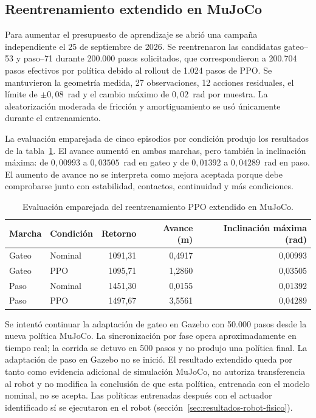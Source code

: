 \subsection{Reentrenamiento extendido en MuJoCo}

Para aumentar el presupuesto de aprendizaje se abrió una campaña independiente
el 25 de septiembre de 2026. Se reentrenaron las candidatas gateo--53 y
paso--71 durante 200.000 pasos solicitados, que correspondieron a 200.704 pasos
efectivos por política debido al rollout de 1.024 pasos de PPO. Se mantuvieron
la geometría medida, 27 observaciones, 12 acciones residuales, el límite de
$\pm 0{,}08$~rad y el cambio máximo de $0{,}02$~rad por muestra. La
aleatorización moderada de fricción y amortiguamiento se usó únicamente durante
el entrenamiento.

La evaluación emparejada de cinco episodios por condición produjo los
resultados de la tabla~\ref{tab:ppo-extendido}. El avance aumentó en ambas
marchas, pero también la inclinación máxima: de $0{,}00993$ a $0{,}03505$~rad
en gateo y de $0{,}01392$ a $0{,}04289$~rad en paso. El aumento de avance no se
interpreta como mejora aceptada porque debe comprobarse junto con estabilidad,
contactos, continuidad y más condiciones.

\begin{table}[H]
\centering
\caption{Evaluación emparejada del reentrenamiento PPO extendido en MuJoCo.}
\label{tab:ppo-extendido}
\small
\begin{tabular}{llrrr}
\toprule
Marcha & Condición & Retorno & Avance (m) & Inclinación máxima (rad) \\
\midrule
Gateo & Nominal & 1091,31 & 0,4917 & 0,00993 \\
Gateo & PPO & 1095,71 & 1,2860 & 0,03505 \\
Paso & Nominal & 1451,30 & 0,0155 & 0,01392 \\
Paso & PPO & 1497,67 & 3,5561 & 0,04289 \\
\bottomrule
\end{tabular}
\end{table}

Se intentó continuar la adaptación de gateo en Gazebo con 50.000 pasos desde
la nueva política MuJoCo. La sincronización por fase opera aproximadamente en
tiempo real; la corrida se detuvo en 500 pasos y no produjo una política final.
La adaptación de paso en Gazebo no se inició. El resultado extendido queda por
tanto como evidencia adicional de simulación MuJoCo, no autoriza transferencia
al robot y no modifica la conclusión de que esta política, entrenada con el
modelo nominal, no se acepta. Las políticas entrenadas después con el actuador
identificado sí se ejecutaron en el robot
(sección~\ref{sec:resultados-robot-fisico}).

